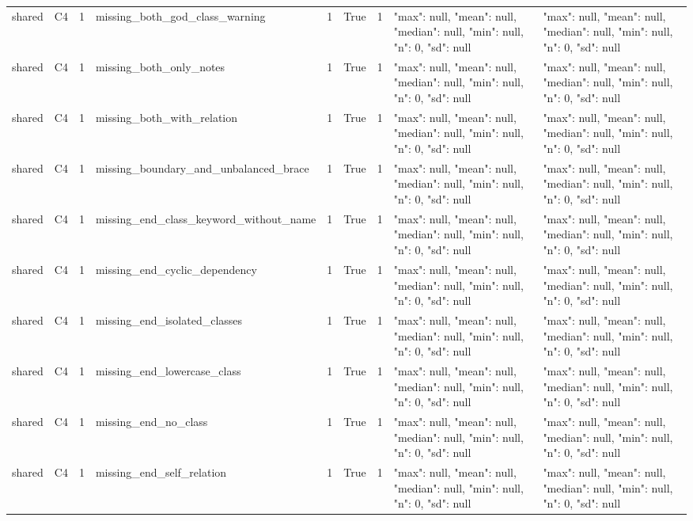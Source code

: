 \begin{tabular}{lllllllll}
shared & C4 & 1 & missing\_both\_god\_class\_warning & 1 & True & 1 & {"max": null, "mean": null, "median": null, "min": null, "n": 0, "sd": null} & {"max": null, "mean": null, "median": null, "min": null, "n": 0, "sd": null} \\
shared & C4 & 1 & missing\_both\_only\_notes & 1 & True & 1 & {"max": null, "mean": null, "median": null, "min": null, "n": 0, "sd": null} & {"max": null, "mean": null, "median": null, "min": null, "n": 0, "sd": null} \\
shared & C4 & 1 & missing\_both\_with\_relation & 1 & True & 1 & {"max": null, "mean": null, "median": null, "min": null, "n": 0, "sd": null} & {"max": null, "mean": null, "median": null, "min": null, "n": 0, "sd": null} \\
shared & C4 & 1 & missing\_boundary\_and\_unbalanced\_brace & 1 & True & 1 & {"max": null, "mean": null, "median": null, "min": null, "n": 0, "sd": null} & {"max": null, "mean": null, "median": null, "min": null, "n": 0, "sd": null} \\
shared & C4 & 1 & missing\_end\_class\_keyword\_without\_name & 1 & True & 1 & {"max": null, "mean": null, "median": null, "min": null, "n": 0, "sd": null} & {"max": null, "mean": null, "median": null, "min": null, "n": 0, "sd": null} \\
shared & C4 & 1 & missing\_end\_cyclic\_dependency & 1 & True & 1 & {"max": null, "mean": null, "median": null, "min": null, "n": 0, "sd": null} & {"max": null, "mean": null, "median": null, "min": null, "n": 0, "sd": null} \\
shared & C4 & 1 & missing\_end\_isolated\_classes & 1 & True & 1 & {"max": null, "mean": null, "median": null, "min": null, "n": 0, "sd": null} & {"max": null, "mean": null, "median": null, "min": null, "n": 0, "sd": null} \\
shared & C4 & 1 & missing\_end\_lowercase\_class & 1 & True & 1 & {"max": null, "mean": null, "median": null, "min": null, "n": 0, "sd": null} & {"max": null, "mean": null, "median": null, "min": null, "n": 0, "sd": null} \\
shared & C4 & 1 & missing\_end\_no\_class & 1 & True & 1 & {"max": null, "mean": null, "median": null, "min": null, "n": 0, "sd": null} & {"max": null, "mean": null, "median": null, "min": null, "n": 0, "sd": null} \\
shared & C4 & 1 & missing\_end\_self\_relation & 1 & True & 1 & {"max": null, "mean": null, "median": null, "min": null, "n": 0, "sd": null} & {"max": null, "mean": null, "median": null, "min": null, "n": 0, "sd": null} \\

\end{tabular}
